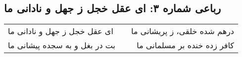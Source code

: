 \begin{center}
\section*{رباعی شماره ۳: ای عقل خجل ز جهل و نادانی ما}
\label{sec:003}
\begin{longtable}{l p{0.5cm} r}
ای عقل خجل ز جهل و نادانی ما
&&
درهم شده خلقی، ز پریشانی ما
\\
بت در بغل و به سجده پیشانی ما
&&
کافر زده خنده بر مسلمانی ما
\\
\end{longtable}
\end{center}
